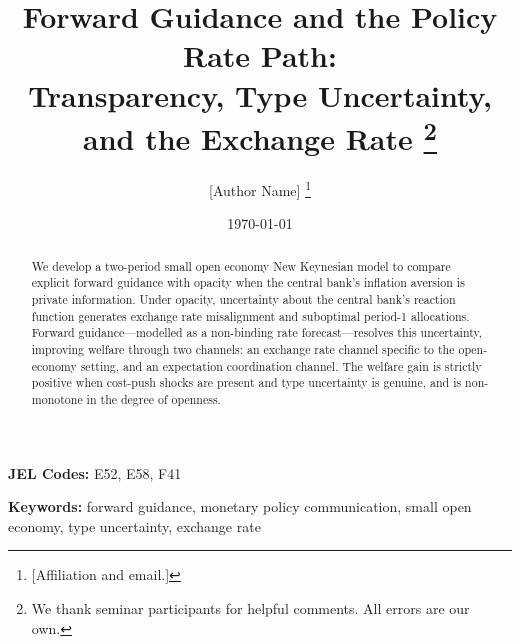 \documentclass[12pt]{article}
\title{Forward Guidance and the Policy Rate Path:\\
       Transparency, Type Uncertainty, and the Exchange Rate%
       \thanks{We thank seminar participants for helpful comments.
       All errors are our own.}}
\author{[Author Name]%
        \thanks{[Affiliation and email.]}}
\date{\today}
\begin{document}

\maketitle
\thispagestyle{empty}

\begin{abstract}
\noindent\singlespacing
We develop a two-period small open economy New Keynesian model to compare explicit
forward guidance with opacity when the central bank's inflation aversion is private
information. Under opacity, uncertainty about the central bank's reaction function
generates exchange rate misalignment and suboptimal period-1 allocations. Forward
guidance---modelled as a non-binding rate forecast---resolves this uncertainty,
improving welfare through two channels: an exchange rate channel specific to the
open-economy setting, and an expectation coordination channel. The welfare gain is
strictly positive when cost-push shocks are present and type uncertainty is genuine,
and is non-monotone in the degree of openness.
\end{abstract}

\vspace{1em}
\noindent\textbf{JEL Codes:} E52, E58, F41

\vspace{0.5em}
\noindent\textbf{Keywords:} forward guidance, monetary policy communication,
small open economy, type uncertainty, exchange rate

\newpage
\setcounter{page}{1}
\doublespacing













\newpage
\singlespacing


\end{document}
